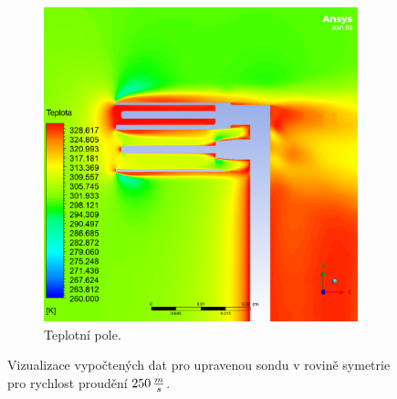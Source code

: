 \begin{figure}[ht!]
\begin{subfigure}{0.45\textwidth}
                    \includegraphics[width=\textwidth]{500_FINAL/SIM_Final_XY0_teplota.png}
                    \caption{Teplotní pole.}
                \end{subfigure}
                \caption{Vizualizace vypočtených dat pro upravenou sondu v rovině symetrie pro rychlost proudění $250 \, \frac{m}{s}$.}
                \label{fig:sonda-final-vizualizace}
            \end{figure}

        \newpage
